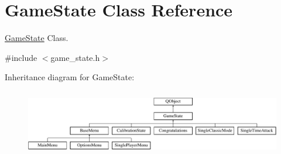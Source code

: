 \hypertarget{class_game_state}{\section{Game\-State Class Reference}
\label{class_game_state}
}


\hyperlink{class_game_state}{Game\-State} Class.  




{\ttfamily \#include $<$game\-\_\-state.\-h$>$}

Inheritance diagram for Game\-State\-:\begin{figure}[H]
\begin{center}
\leavevmode
\includegraphics[height=2.916667cm]{class_game_state}
\end{center}
\end{figure}
